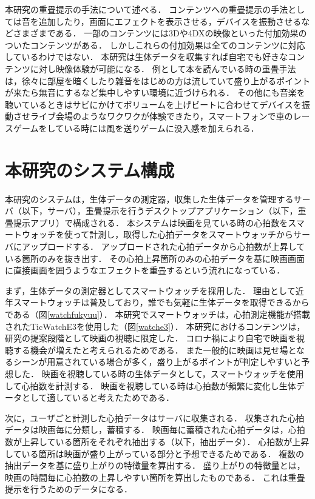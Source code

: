 本研究の重畳提示の手法について述べる．
コンテンツへの重畳提示の手法としては音を追加したり，画面にエフェクトを表示させる，デバイスを振動させるなどさまざまである．
一部のコンテンツには3Dや4DXの映像といった付加効果のついたコンテンツがある．
しかしこれらの付加効果は全てのコンテンツに対応しているわけではない．
本研究は生体データを収集すれば自宅でも好きなコンテンツに対し映像体験が可能になる．
例として本を読んでいる時の重畳手法は，徐々に部屋を暗くしたり雑音をはじめの方は流していて盛り上がるポイントが来たら無音にするなど集中しやすい環境に近づけられる．
その他にも音楽を聴いているときはサビにかけてボリュームを上げビートに合わせてデバイスを振動させライブ会場のようなワクワクが体験できたり，スマートフォンで車のレースゲームをしている時には風を送りゲームに没入感を加えられる．


\section{本研究のシステム構成}
本研究のシステムは，生体データの測定器，収集した生体データを管理するサーバ（以下，サーバ），重畳提示を行うデスクトップアプリケーション（以下，重畳提示アプリ）で構成される．
本システムは映画を見ている時の心拍数をスマートウォッチを使って計測し，取得した心拍データをスマートウォッチからサーバにアップロードする．
アップロードされた心拍データから心拍数が上昇している箇所のみを抜き出す．
その心拍上昇箇所のみの心拍データを基に映画画面に直接画面を囲うようなエフェクトを重畳するという流れになっている．

まず，生体データの測定器としてスマートウォッチを採用した．
理由として近年スマートウォッチは普及しており，誰でも気軽に生体データを取得できるからである（図\ref{watchfukyuu}）．
本研究でスマートウォッチは，心拍測定機能が搭載されたTicWatchE3を使用した（図\ref{watche3}）．
本研究におけるコンテンツは，研究の提案段階として映画の視聴に限定した．
コロナ禍により自宅で映画を視聴する機会が増えたと考えられるためである．
また一般的に映画は見せ場となるシーンが用意されている場合が多く，盛り上がるポイントが判定しやすいと予想した．
映画を視聴している時の生体データとして，スマートウォッチを使用して心拍数を計測する．
映画を視聴している時は心拍数が頻繁に変化し生体データとして適していると考えたためである．

次に，ユーザごと計測した心拍データはサーバに収集される．
収集された心拍データは映画毎に分類し，蓄積する．
映画毎に蓄積された心拍データは，心拍数が上昇している箇所をそれぞれ抽出する（以下，抽出データ）．
心拍数が上昇している箇所は映画が盛り上がっている部分と予想できるためである．
複数の抽出データを基に盛り上がりの特徴量を算出する．
盛り上がりの特徴量とは，映画の時間毎に心拍数の上昇しやすい箇所を算出したものである．
これは重畳提示を行うためのデータになる．


